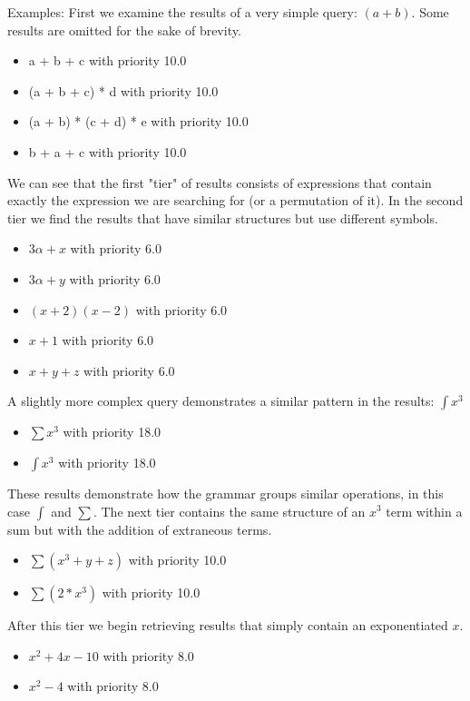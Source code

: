 \documentclass{sig-alternate}
\begin{document}
Examples:
First we examine the results of a very simple query: $(a+b)$.
Some results are omitted for the sake of brevity.
\begin{itemize}
    \item a + b + c  with priority  10.0
    \item (a + b + c) * d  with priority  10.0
    \item (a + b) * (c + d) * e  with priority  10.0
    \item b + a + c  with priority  10.0
\end{itemize}
We can see that the first "tier" of results consists of expressions that contain exactly the expression we are searching for
(or a permutation of it). In the second tier we find the results that have similar structures but use different symbols.
\begin{itemize}
    \item $3\alpha + x$  with priority  6.0
    \item $3\alpha + y$  with priority  6.0
    \item $(x + 2)(x-2)$  with priority  6.0
    \item $x + 1$  with priority  6.0
    \item $x + y + z$  with priority  6.0
\end{itemize}

A slightly more complex query demonstrates a similar pattern in the results: $\int x^3$
\begin{itemize}
    \item  $\sum x^3$  with priority  18.0
    \item  $\int x^3$  with priority  18.0
\end{itemize}
These results demonstrate how the grammar groups similar operations, in this case $\int$ and $\sum$. 
The next tier contains the same structure of an $x^3$ term within a sum but with the addition of extraneous terms.
\begin{itemize}
    \item $\sum (x^3 + y+ z)$  with priority  10.0
    \item $\sum (2*x^3)$  with priority  10.0
\end{itemize}
After this tier we begin retrieving results that simply contain an exponentiated $x$.
\begin{itemize}
    \item $x^2 + 4x - 10$  with priority  8.0
    \item $x^2 - 4$  with priority  8.0
\end{itemize}
\end{document}
